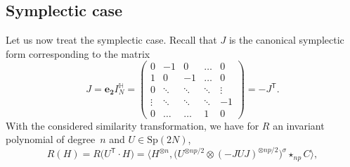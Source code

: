 \documentclass[pdftex]{sigma}
\numberwithin{equation}{section}
\theoremstyle{definition}
\begin{document}
\subsection{Symplectic case}

Let us now treat the symplectic case. Recall that $J$ is the canonical symplectic form corresponding to the matrix \[J=\mathbf{e_2}I^{\mathbb{H}}_N =\begin{pmatrix} 0 & -1 & 0 & \dots &0 \\ 1 & 0 & -1 & \dots & 0 \\ 0 & \ddots & \ddots & \ddots & \vdots \\ \vdots & \ddots & \ddots & \ddots & -1 \\ 0 & \dots & \dots & 1 & 0 \end{pmatrix} =-J^{\mathsf T}.\]
With the considered similarity transformation, we have for $R$ an invariant polynomial of degree~$n$ and $U \in \mathrm{Sp}(2N)$,
\[ R(H) = R\bigl(U^{\mathsf T} \cdot H\bigr)= \big\langle H^{\otimes n}, \bigl(U^{\otimes np/2} \otimes (-JUJ)^{\otimes np/2}\bigr)^{\sigma} \star_{np} C \big\rangle, \]
\end{document}
